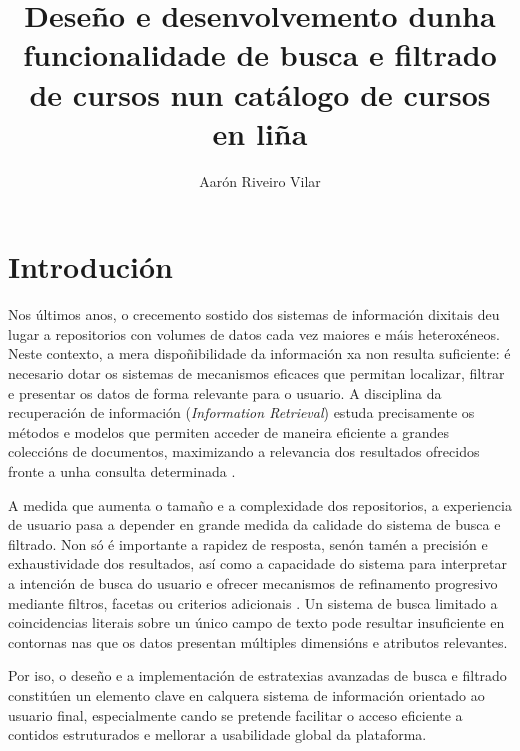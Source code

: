 \documentclass[%
    a4paper,               %
    twoside,               %
    10pt,                  %
]{article}                 %
\title{Deseño e desenvolvemento dunha funcionalidade de busca e filtrado de cursos nun catálogo de cursos en liña}
\author{Aarón Riveiro Vilar}
\begin{document}
\hypersetup{pageanchor=false}
\maketitle
\tableofcontents
\clearpage
\hypersetup{pageanchor=true}

\section{Introdución}
Nos últimos anos, o crecemento sostido dos sistemas de información dixitais deu lugar a repositorios con volumes de datos cada vez maiores e máis heteroxéneos. Neste contexto, a mera dispoñibilidade da información xa non resulta suficiente: é necesario dotar os sistemas de mecanismos eficaces que permitan localizar, filtrar e presentar os datos de forma relevante para o usuario. A disciplina da recuperación de información (\textit{Information Retrieval}) estuda precisamente os métodos e modelos que permiten acceder de maneira eficiente a grandes coleccións de documentos, maximizando a relevancia dos resultados ofrecidos fronte a unha consulta determinada \cite{sanderson2012}.

A medida que aumenta o tamaño e a complexidade dos repositorios, a experiencia de usuario pasa a depender en grande medida da calidade do sistema de busca e filtrado. Non só é importante a rapidez de resposta, senón tamén a precisión e exhaustividade dos resultados, así como a capacidade do sistema para interpretar a intención de busca do usuario e ofrecer mecanismos de refinamento progresivo mediante filtros, facetas ou criterios adicionais \cite{raghavan1989}. Un sistema de busca limitado a coincidencias literais sobre un único campo de texto pode resultar insuficiente en contornas nas que os datos presentan múltiples dimensións e atributos relevantes.

Por iso, o deseño e a implementación de estratexias avanzadas de busca e filtrado constitúen un elemento clave en calquera sistema de información orientado ao usuario final, especialmente cando se pretende facilitar o acceso eficiente a contidos estruturados e mellorar a usabilidade global da plataforma.

\end{document}
